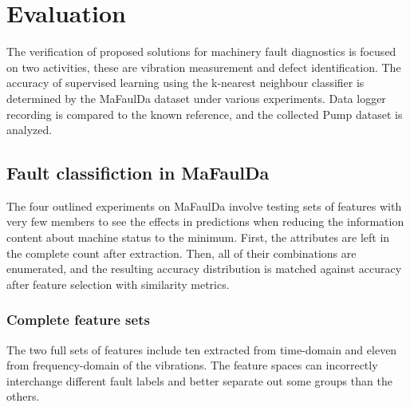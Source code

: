 \chapter{Evaluation} \label{chapter:evaluation}
The verification of proposed solutions for machinery fault diagnostics is focused on two activities, these are vibration measurement and defect identification. The accuracy of supervised learning using the k-nearest neighbour classifier is determined by the MaFaulDa dataset under various experiments. Data logger recording is compared to the known reference, and the collected Pump dataset is analyzed.

\section{Fault classifiction in MaFaulDa}
The four outlined experiments on MaFaulDa involve testing sets of features with very few members to see the effects in predictions when reducing the information content about machine status to the minimum. First, the attributes are left in the complete count after extraction. Then, all of their combinations are enumerated, and the resulting accuracy distribution is matched against accuracy after feature selection with similarity metrics. 

\subsection{Complete feature sets}
The two full sets of features include ten extracted from time-domain and eleven from frequency-domain of the vibrations. The feature spaces can incorrectly interchange different fault labels and better separate out some groups than the others. 

